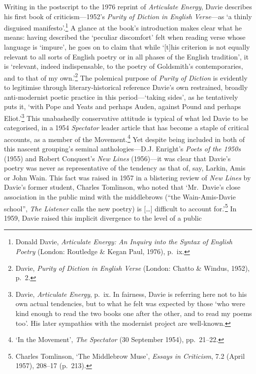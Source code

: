 \documentclass[]{article}
\begin{document}
Writing in the postscript to the 1976 reprint of \emph{Articulate
Energy}, Davie describes his first book of criticism---1952's
\emph{Purity of Diction in English Verse}---as `a thinly disguised
manifesto'.\footnote{Donald Davie, \emph{Articulate Energy: An Inquiry
  into the Syntax of English Poetry} (London: Routledge \& Kegan Paul,
  1976), p.~ix.} A glance at the book's introduction makes clear what he
means: having described the `peculiar discomfort' felt when reading
verse whose language is `impure', he goes on to claim that while
`{[}t{]}his criterion is not equally relevant to all sorts of English
poetry or in all phases of the English tradition', it is `relevant,
indeed indispensable, to the poetry of Goldsmith's contemporaries, and
to that of my own.'\footnote{Davie, \emph{Purity of Diction in English
  Verse} (London: Chatto \& Windus, 1952), p.~2.} The polemical purpose
of \emph{Purity of Diction} is evidently to legitimise through
literary-historical reference Davie's own restrained, broadly
anti-modernist poetic practice in this period---`taking sides', as he
tentatively puts it, `with Pope and Yeats and perhaps Auden, against
Pound and perhaps Eliot.'\footnote{Davie, \emph{Articulate Energy},
  p.~ix. In fairness, Davie is referring here not to his own actual
  tendencies, but to what he felt was expected by those `who were kind
  enough to read the two books one after the other, and to read my poems
  too'. His later sympathies with the modernist project are well-known.}
This unabashedly conservative attitude is typical of what led Davie to
be categorised, in a 1954 \emph{Spectator} leader article that has
become a staple of critical accounts, as a member of the
Movement.\footnote{`In the Movement', \emph{The Spectator} (30 September
  1954), pp.~21--22.} Yet despite being included in both of this nascent
grouping's seminal anthologies---D.J. Enright's \emph{Poets of the
1950s} (1955) and Robert Conquest's \emph{New Lines} (1956)---it was
clear that Davie's poetry was never as representative of the tendency as
that of, say, Larkin, Amis or John Wain. This fact was raised in 1957 in
a blistering review of \emph{New Lines} by Davie's former student,
Charles Tomlinson, who noted that `Mr.~Davie's close association in the
public mind with the middlebrows (``the Wain-Amis-Davie school'',
\emph{The Listener} calls the new poetry) is {[}\ldots{}{]} difficult to
account for.'\footnote{Charles Tomlinson, `The Middlebrow Muse',
  \emph{Essays in Criticism}, 7.2 (April 1957), 208--17 (p.~213).} In
1959, Davie raised this implicit divergence to the level of a public
\end{document}
